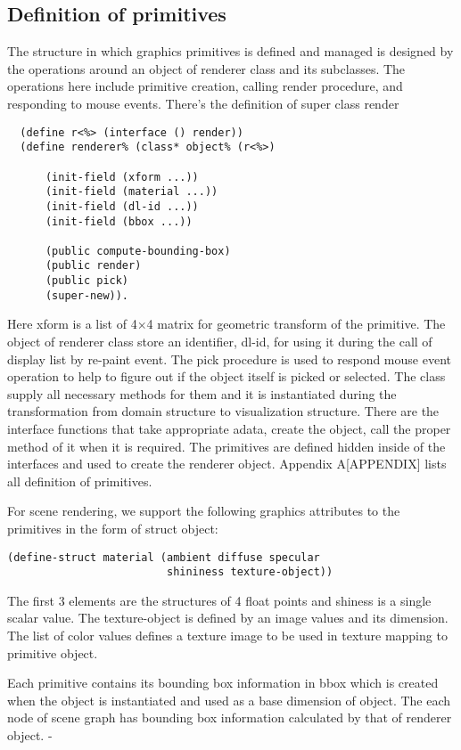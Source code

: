 \documentclass[preprint,nocopyrightspace]{sigplanconf}
\begin{document}
\subsection{Definition of primitives}
The structure in which graphics primitives is defined and managed is designed by the operations around an object of renderer class and its subclasses. 
The operations here include primitive creation, calling render procedure, and responding to mouse events. 
There's the definition of super class render%
\begin{verbatim}
  (define r<%> (interface () render))
  (define renderer% (class* object% (r<%>)
      
      (init-field (xform ...))
      (init-field (material ...))
      (init-field (dl-id ...))
      (init-field (bbox ...))

      (public compute-bounding-box)
      (public render)
      (public pick)
      (super-new)).
\end{verbatim}
Here xform is a list of 4$\times$4 matrix for geometric transform of the primitive. 
The object of renderer class store an identifier, dl-id, for using it during the call of display list by re-paint event. 
The pick procedure is used to respond mouse event operation to help to figure out if the object itself is picked or selected. 
The class supply all necessary methods for them and it is instantiated during the transformation from domain structure to visualization structure. 
There are the interface functions that take appropriate adata, create the object, call the proper method of it when it is required. 
The primitives are defined hidden inside of the interfaces and used to create the renderer object. 
Appendix A[APPENDIX] lists all definition of primitives.

For scene rendering, we support the following graphics attributes to the primitives in the form of struct object:
\begin{verbatim}
(define-struct material (ambient diffuse specular 
                         shininess texture-object))
\end{verbatim} 
The first 3 elements are the structures of 4 float points and shiness is a single scalar value. The texture-object is defined by an image values and its dimension. The list of color values defines a texture image to be used in texture mapping to primitive object.

Each primitive contains its bounding box information in bbox which is created when the object is instantiated and used as a base dimension of object. The each node of scene graph has bounding box information calculated by that of renderer object.
 -
\end{document}
